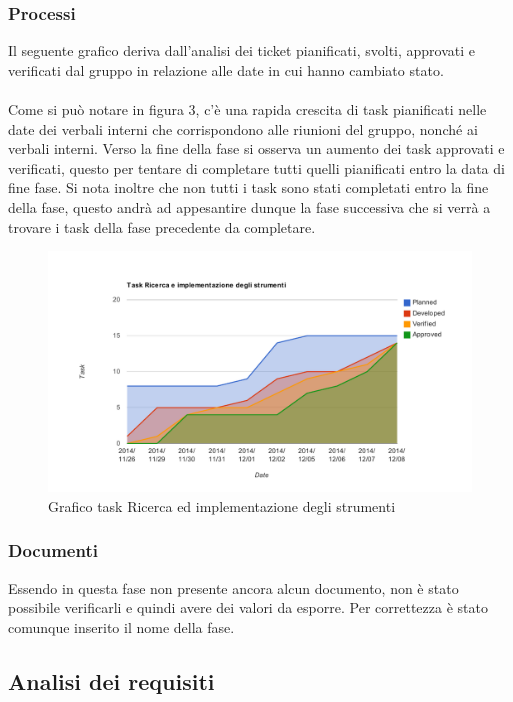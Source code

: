 		\subsubsection{Processi}
		Il seguente grafico deriva dall'analisi dei ticket pianificati, svolti, approvati e verificati dal gruppo in relazione alle date in cui hanno cambiato stato. \\ \\
		Come si può notare in figura 3, c'è una rapida crescita di task pianificati nelle date dei verbali interni che corrispondono alle riunioni del gruppo, nonché ai verbali interni. Verso la fine della fase si osserva un aumento dei task approvati e verificati, questo per tentare di completare tutti quelli pianificati entro la data di fine fase. Si nota inoltre che non tutti i task sono stati completati entro la fine della fase, questo andrà ad appesantire dunque la fase successiva che si verrà a trovare i task della fase precedente da completare.
			\begin{figure}[htbp]
				\centering
				\centerline{\includegraphics[scale=1]{images/Grafico_fase_1.pdf}}
				\caption{Grafico task Ricerca ed implementazione degli strumenti}
				\label{fig:taskfase1}
			\end{figure}
		\subsubsection{Documenti}
		Essendo in questa fase non presente ancora alcun documento, non è stato possibile verificarli e quindi avere dei valori da esporre. Per correttezza è stato comunque inserito il nome della fase.
	
	\subsection{Analisi dei requisiti}
